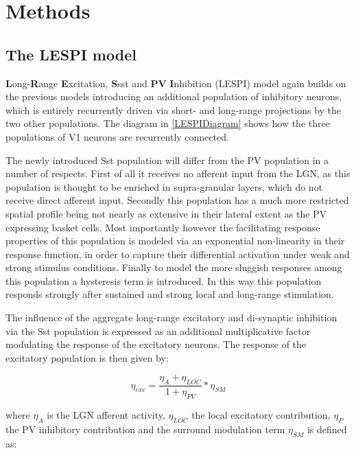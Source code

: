 \section{Methods}

\subsection{The LESPI model}

\textbf{L}ong-\textbf{R}ange \textbf{E}xcitation, \textbf{S}sst and
\textbf{PV} \textbf{I}nhibition (LESPI) model again builds on the
previous models introducing an additional population of inhibitory
neurons, which is entirely recurrently driven via short- and
long-range projections by the two other populations. The diagram in
\ref{LESPIDiagram} shows how the three populations of V1 neurons are
recurrently connected.

The newly introduced Sst population will differ from the PV population
in a number of respects. First of all it receives no afferent input
from the LGN, as this population is thought to be enriched in
supra-granular layers, which do not receive direct afferent
input. Secondly this population has a much more restricted spatial
profile being not nearly as extensive in their lateral extent as the
PV expressing basket cells. Most importantly however the facilitating
response properties of this population is modeled via an exponential
non-linearity in their response function, in order to capture their
differential activation under weak and strong stimulus
conditions. Finally to model the more sluggish responses among this
population a hysteresis term is introduced. In this way this
population responds strongly after sustained and strong local and
long-range stimulation.

The influence of the aggregate long-range excitatory and di-synaptic
inhibition via the Sst population is expressed as an additional
multiplicative factor modulating the response of the excitatory
neurons. The response of the excitatory population is then given by:

\begin{equation}
  \eta_{exc} = \frac{\eta_{A} + \eta_{LOC}}{1 + \eta_{PV}} * \eta_{SM}
\end{equation}

where $\eta_{A}$ is the LGN afferent activity, $\eta_{LOC}$ the local
excitatory contribution, $\eta_{P}$ the PV inhibitory contribution
and the surround modulation term $\eta_{SM}$ is defined as:

